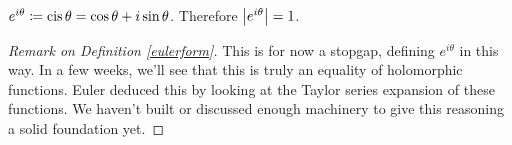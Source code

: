 \medskip

\begin{definition}\label{eulerform}
$e^{i\theta} \coloneqq \operatorname{cis}\theta = \cos\theta + i\sin\theta$. Therefore $\left\lvert e^{i\theta}\right\rvert = 1$.
\end{definition}
\begin{proof}[Remark on Definition \ref{eulerform}]\renewcommand{\qedsymbol}{}
This is for now a stopgap, defining $e^{i\theta}$ in this way. In a few weeks, we'll see that this is truly an equality of holomorphic functions. Euler deduced this by looking at the Taylor series expansion of these functions. We haven't built or discussed enough machinery to give this reasoning a solid foundation yet. 
\end{proof}

\medskip

